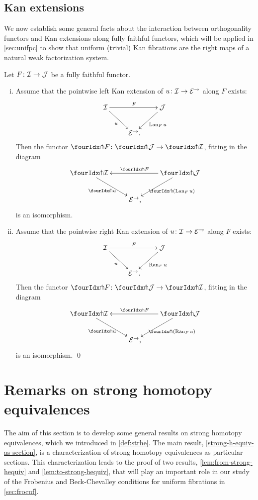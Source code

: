 \documentclass[reqno,10pt,a4paper,oneside,draft]{amsart}
\begin{document}
\subsection*{Kan extensions}

We now establish some general facts about the interaction between orthogonality functors and Kan extensions along fully faithful functors, which will be applied in \cref{sec:unifpc} to show that uniform (trivial) Kan fibrations are the right maps of a natural weak factorization system.

\begin{proposition} \label{kan-extension-closure}
Let $F \colon \mathcal{I} \to \mathcal{J}$ be a fully faithful functor.
\begin{enumerate}[(i)]
\item Assume that the pointwise left Kan extension of $u \colon \mathcal{I} \to \mathcal{E}^\to$ along $F$ exists:
\[
\xymatrix{
  \cal{I}
  \ar[dr]_{u}
  \ar[rr]^{F}
&&
  \cal{J}
  \ar[dl]^{\Lan_F u}
\\&
  \catE^\to
\rlap{.}}
\]
Then the functor $\liftr{F} \co \liftr{\cal{J}} \to \liftr{\cal{I}}$, fitting in the diagram
\[
\xymatrix{
  \liftr{\cal{I}}
  \ar[dr]_{\liftr{u}}
&&
  \liftr{\cal{J}}
  \ar[ll]_{\liftr{F}}
  \ar[dl]^{\liftr{(\Lan_F u)}}
\\&
  \catE^\to
\rlap{,}}
\]
is an isomorphism.
\item Assume that the pointwise right Kan extension of $u \colon \mathcal{I} \to \mathcal{E}^\to$ along $F$ exists:
\[
\xymatrix{
  \cal{I}
  \ar[dr]_{u}
  \ar[rr]^{F}
&&
  \cal{J}
  \ar[dl]^{\Ran_F u}
\\&
  \catE^\to
\rlap{.}}
\]
Then the functor $\liftl{F} \co \liftl{\cal{J}} \to \liftl{\cal{I}}$, fitting in the diagram
\[
\xymatrix{
  \liftl{\cal{I}}
  \ar[dr]_{\liftl{u}}
&&
  \liftl{\cal{J}}
  \ar[ll]_{\liftl{F}}
  \ar[dl]^{\liftl{(\Ran_F u)}}
\\&
  \catE^\to
\rlap{,}}
\]
is an isomorphism.
\qed
\end{enumerate}
\end{proposition}


\section{Remarks on strong homotopy equivalences}
\label{sec:remshe}

The aim of this section is to develop some general results on strong homotopy equivalences, which we introduced in \cref{def:strhe}.
The main result, \cref{strong-h-equiv-as-section}, is a characterization of strong homotopy equivalences as particular sections.
This characterization leads to the proof of two results, \cref{lem:from-strong-hequiv} and \cref{lem:to-strong-hequiv}, that will play an important role in our study of the Frobenius and Beck-Chevalley conditions for uniform fibrations in \cref{sec:frocuf}.
\end{document}
